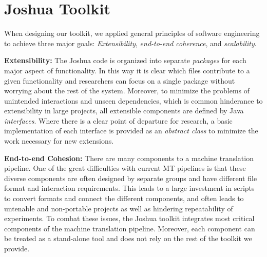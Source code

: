 \documentclass[11pt]{article}
\begin{document}



\section{Joshua Toolkit}
When designing our toolkit, we applied general principles of software engineering to achieve three major goals: \emph{Extensibility}, \emph{end-to-end coherence}, and \emph{scalability}.

\textbf{Extensibility:} The Joshua code is organized into separate \emph{packages} for each major aspect of functionality. In this way it is clear which files contribute to a given functionality and researchers can focus on a single package without worrying about the rest of the system. Moreover, to minimize the problems of unintended interactions and unseen dependencies, which is common hinderance to extensibility in large projects, all extensible components are defined by Java \emph{interfaces}. Where there is a clear point of departure for research, a basic implementation of each interface is provided as an \emph{abstract class} to minimize the work necessary for new extensions.

\textbf{End-to-end Cohesion:} There are many components to a machine translation pipeline. One of the great difficulties with current MT pipelines is that these diverse components are often designed by separate groups and have different file format and interaction requirements. This leads to a large investment in scripts to convert formats and connect the different components, and often leads to untenable and non-portable projects as well as hindering repeatability of experiments.
To combat these issues, the Joshua toolkit integrates most critical components of the machine translation pipeline. Moreover, each component can be treated as a stand-alone tool and does not rely on the rest of the toolkit we provide.
\end{document}
